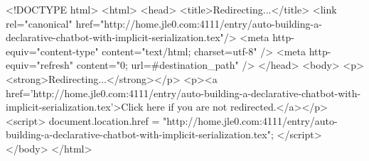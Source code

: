 <!DOCTYPE html>
<html>
<head>
<title>Redirecting...</title>
<link rel="canonical" href="http://home.jle0.com:4111/entry/auto-building-a-declarative-chatbot-with-implicit-serialization.tex"/>
<meta http-equiv="content-type" content="text/html; charset=utf-8" />
<meta http-equiv="refresh" content="0; url=#{destination_path}" />
</head>
<body>
  <p><strong>Redirecting...</strong></p>
  <p><a href='http://home.jle0.com:4111/entry/auto-building-a-declarative-chatbot-with-implicit-serialization.tex'>Click here if you are not redirected.</a></p>
  <script>
    document.location.href = "http://home.jle0.com:4111/entry/auto-building-a-declarative-chatbot-with-implicit-serialization.tex";
  </script>
</body>
</html>
